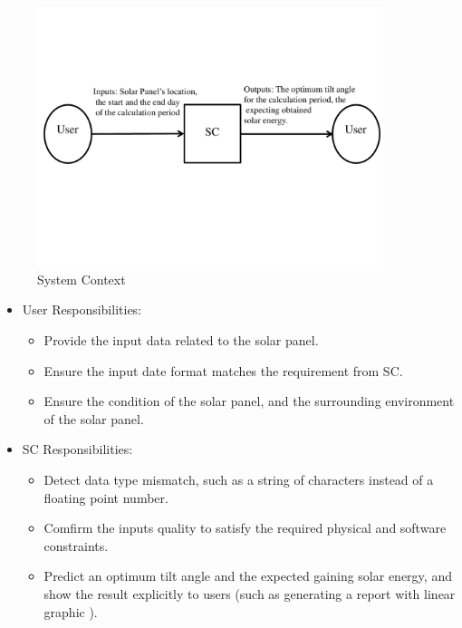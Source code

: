 \documentclass[12pt]{article}
\begin{document}
\begin{figure}[H]
\begin{center}
 \includegraphics[width=0.9\textwidth]{SystemContextFigure}
\caption{System Context}
\label{Fig_SystemContext} 
\end{center}
\end{figure}

\medskip

\begin{itemize}
\item User Responsibilities:
\begin{itemize}
\item Provide the input data related to the solar panel. 
\item Ensure the input date format matches the requirement from SC.
\item Ensure the condition of the solar panel, and the surrounding environment of the solar panel.
\end{itemize}
\item SC Responsibilities:
\begin{itemize}
\item Detect data type mismatch, such as a string of characters instead of a
  floating point number.
\item Comfirm the inputs quality to satisfy the required physical and software constraints.
\item Predict an optimum tilt angle and the expected gaining solar energy, and show the result explicitly to users (such as generating a report with linear graphic ).

\end{itemize}
\end{itemize}
\end{document}
